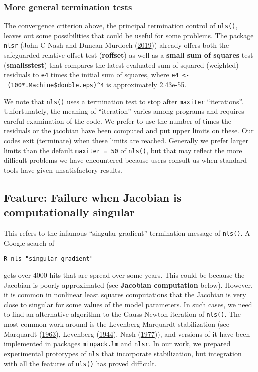 \documentclass[
]{article}
\begin{document}
\hypertarget{more-general-termination-tests}{%
\subsubsection{More general termination
tests}\label{more-general-termination-tests}}

The convergence criterion above, the principal termination control of
\texttt{nls()}, leaves out some possibilities that could be useful for
some problems. The package \texttt{nlsr} (John C Nash and Duncan Murdoch
(\protect\hyperlink{ref-nlsr2019manual}{2019})) already offers both the
safeguarded relative offset test (\textbf{roffset}) as well as a
\textbf{small sum of squares} test (\textbf{smallsstest}) that compares
the latest evaluated sum of squared (weighted) residuals to \texttt{e4}
times the initial sum of squares, where
\texttt{e4\ \textless{}-\ (100*.Machine\$double.eps)\^{}4} is
approximately 2.43e-55.

We note that \texttt{nls()} uses a termination test to stop after
\texttt{maxiter} ``iterations''. Unfortunately, the meaning of
``iteration'' varies among programs and requires careful examination of
the code. We prefer to use the number of times the residuals or the
jacobian have been computed and put upper limits on these. Our codes
exit (terminate) when these limits are reached. Generally we prefer
larger limits than the default \texttt{maxiter\ =\ 50} of
\texttt{nls()}, but that may reflect the more difficult problems we have
encountered because users consult us when standard tools have given
unsatisfactory results.

\hypertarget{feature-failure-when-jacobian-is-computationally-singular}{%
\subsection{Feature: Failure when Jacobian is computationally
singular}\label{feature-failure-when-jacobian-is-computationally-singular}}

This refers to the infamous ``singular gradient'' termination message of
\texttt{nls()}. A Google search of

\begin{verbatim}
R nls "singular gradient"
\end{verbatim}

gets over 4000 hits that are spread over some years. This could be
because the Jacobian is poorly approximated (see \textbf{Jacobian
computation} below). However, it is common in nonlinear least squares
computations that the Jacobian is very close to singular for some values
of the model parameters. In such cases, we need to find an alternative
algorithm to the Gauss-Newton iteration of \texttt{nls()}. The most
common work-around is the Levenberg-Marquardt stabilization (see
Marquardt (\protect\hyperlink{ref-Marquardt1963}{1963}), Levenberg
(\protect\hyperlink{ref-Levenberg1944}{1944}), Nash
(\protect\hyperlink{ref-jn77ima}{1977})), and versions of it have been
implemented in packages \texttt{minpack.lm} and \texttt{nlsr}. In our
work, we prepared experimental prototypes of \texttt{nls} that
incorporate stabilization, but integration with all the features of
\texttt{nls()} has proved difficult.
\end{document}
